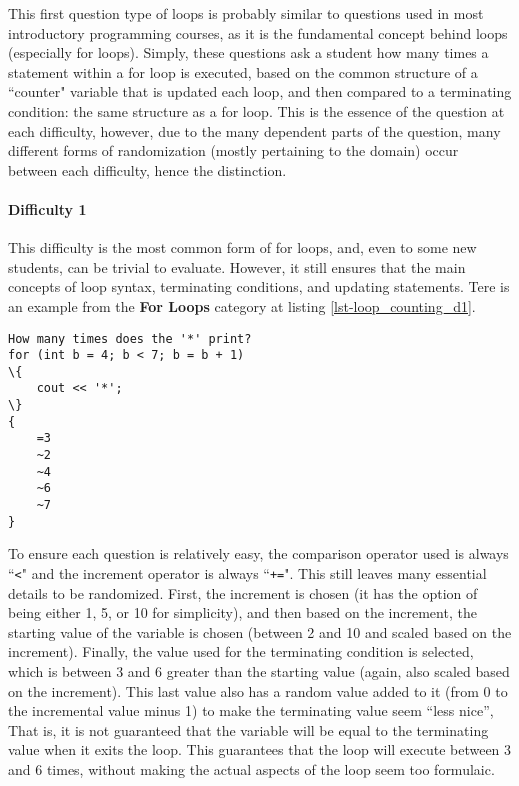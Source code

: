 \documentclass{article}
\begin{document}
This first question type of loops is probably similar to questions used in most introductory programming courses, as it is the fundamental concept behind loops (especially for loops). Simply, these
questions ask a student how many times a statement within a for loop is executed, based on the common structure of a ``counter" variable that is updated each loop, and then compared to a
terminating condition: the same structure as a for loop. This is the essence of the question at each difficulty, however, due to the many dependent parts of the question, many different forms 
of randomization (mostly pertaining to the domain) occur between each difficulty, hence the distinction.

\paragraph{Difficulty 1} \hfill \par 
This difficulty is the most common form of for loops, and, even to some new students, can be trivial to evaluate. However, it still ensures that the main concepts of loop syntax, terminating 
conditions, and updating statements. Tere is an example from the \textbf{For Loops} category at listing \ref{lst-loop_counting_d1}.

\begin{lstlisting}[caption={Loop Counting Difficulty 1 GIFT Example}, label=lst-loop_counting_d1, float]
How many times does the '*' print? 
for (int b = 4; b < 7; b = b + 1)
\{
	cout << '*';
\}
{
	=3
	~2
	~4
	~6
	~7
}
\end{lstlisting}


To ensure each question is relatively easy, the comparison operator used is always ``\verb;<;" and the increment operator is always ``\verb;+=;". This still leaves many essential details to be 
randomized. First, the increment is chosen (it has the option of being either 1, 5, or 10 for simplicity), and then based on the increment, the starting value of the variable is chosen (between 2 and 10 and scaled based on the increment). Finally, the value used for the terminating condition is selected, which is between 3 and 6 greater than the starting value (again, also scaled based 
on the increment). This last value also has a random value added to it (from 0 to the incremental value minus 1) to make the terminating value seem ``less nice'', That is, it is not guaranteed
that the variable will be equal to the terminating value when it exits the loop. This guarantees that the loop will execute between 3 and 6 times, without making the actual aspects of the loop 
seem too formulaic. 
\end{document}
